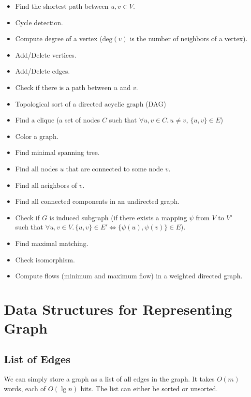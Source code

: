 \begin{multicols*}{2}
    \begin{itemize}
        \item Find the shortest path between $u,v\in V$.
        \item Cycle detection.
        \item Compute degree of a vertex ($\mathrm{deg}(v)$ is the number of neighbors of a vertex).
        \item Add/Delete vertices.
        \item Add/Delete edges.
        \item Check if there is a path between $u$ and $v$.
        \item Topological sort of a directed acyclic graph (DAG)
        \item Find a clique (a set of nodes $C$ such that $\forall u,v \in C.\, u \neq v,\, \{u,v\} \in E$)
        \item Color a graph.
        \item Find minimal spanning tree.
        \item Find all nodes $u$ that are connected to some node $v$.
        \item Find all neighbors of $v$.
        \item Find all connected components in an undirected graph.
        \item Check if $G$ is induced subgraph (if there exists a mapping $\psi$ from $V$ to $V'$ such that $\forall u,v\in V.\, \{u,v\} \in E' \iff \{\psi(u),\psi(v)\} \in E$).
        \item Find maximal matching.
        \item Check isomorphism.
        \item Compute flows (minimum and maximum flow) in a weighted directed graph.
    \end{itemize}
\end{multicols*}

\section{Data Structures for Representing Graph}

\subsection{List of Edges}

We can simply store a graph as a list of all edges in the graph. It takes $O(m)$ words, each of $O(\lg n)$ bits. The list can either be sorted or unsorted.

